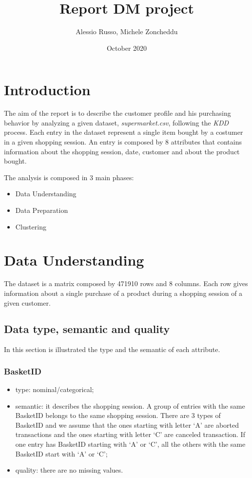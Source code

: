 \documentclass{article}
\title{Report DM project}
\author{Alessio Russo, Michele Zoncheddu}
\date{October 2020}
\begin{document}
\maketitle

\tableofcontents

\section{Introduction}
The aim of the report is to describe the customer profile and his purchasing behavior by analyzing a given dataset, \textit{supermarket.csv},  following the \textit{KDD} process. 
Each entry in the dataset represent a single item bought by a costumer in a given shopping session. An entry is composed by 8 attributes that contains information about the shopping session, date, customer and about the product bought.

The analysis is composed in 3 main phases:
\begin{itemize}
    \item Data Understanding
    \item Data Preparation
    \item Clustering
\end{itemize}

\section{Data Understanding}
The dataset is a matrix composed by 471910 rows and 8 columns. Each row gives information about a single purchase of a product during a shopping session of a given customer.

\subsection{Data type, semantic and quality}
In this section is illustrated the type and the semantic of each attribute. 
\subsubsection{BasketID}
\begin{itemize}
    \item type: nominal/categorical;
    \item semantic: it describes the shopping session. A group of entries with the same BasketID belongs to the same shopping session. There are 3 types of BasketID and we assume that the ones starting with letter `A' are aborted transactions and the ones starting with letter `C' are canceled transaction. If one entry has BasketID starting with `A' or `C', all the others  with the same BasketID start with `A' or `C';
    \item quality: there are no missing values.
\end{itemize}
\end{document}
